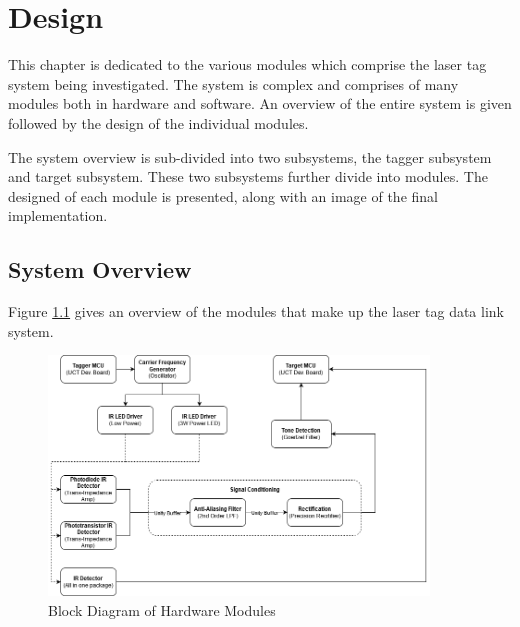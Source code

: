 \chapter{Design}
\label{ch_design}

This chapter is dedicated to the various modules which comprise the laser tag system being investigated. The system is complex and comprises of many modules both in hardware and software. An overview of the entire system is given followed by the design of the individual modules.


The system overview is sub-divided into two subsystems, the tagger subsystem and target subsystem. These two subsystems further divide into modules. The designed of each module is presented, along with an image of the final implementation.


\section{System Overview}

Figure \ref{fig:system_overview_hardware} gives an overview of the modules that make up the laser tag data link system.

\begin{figure}[H]
	\centering
	\includegraphics[width=0.9\textwidth]{figures/design/system_overview_hardware}
	\caption{Block Diagram of Hardware Modules}
	\label{fig:system_overview_hardware}
\end{figure}

